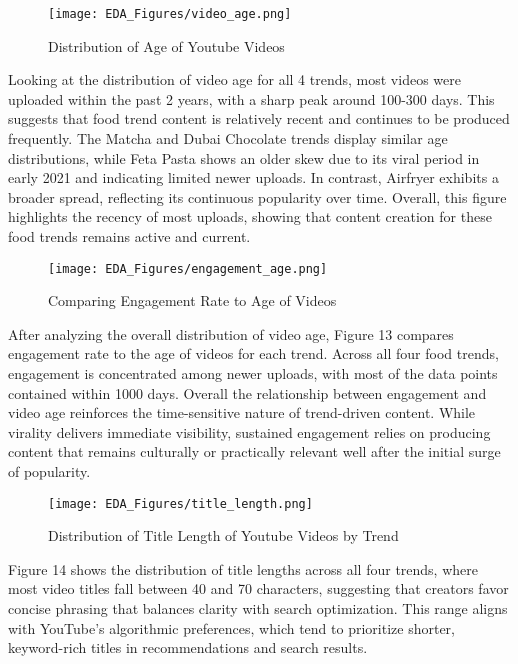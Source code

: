 \documentclass{article}
\begin{document}
\begin{figure}[H]
    \centering
    \texttt{[image: EDA\_Figures/video\_age.png]}
    \caption{Distribution of Age of Youtube Videos}
    \label{fig:video_age}
\end{figure}

Looking at the distribution of video age for all 4 trends, most videos were uploaded within the past 2 years, with a sharp peak around 100-300 days. This suggests that food trend content is relatively recent and continues to be produced frequently. The Matcha and Dubai Chocolate trends display similar age distributions, while Feta Pasta shows an older skew due to its viral period in early 2021 and indicating limited newer uploads. In contrast, Airfryer exhibits a broader spread, reflecting its continuous popularity over time. Overall, this figure highlights the recency of most uploads, showing that content creation for these food trends remains active and current.

\begin{figure}[H]
    \centering
    \texttt{[image: EDA\_Figures/engagement\_age.png]}
    \caption{Comparing Engagement Rate to Age of Videos}
    \label{fig:engagement_age}
\end{figure}

After analyzing the overall distribution of video age, Figure 13 compares engagement rate to the age of videos for each trend. Across all four food trends, engagement is concentrated among newer uploads, with most of the data points contained within 1000 days. Overall the relationship between engagement and video age reinforces the time-sensitive nature of trend-driven content. While virality delivers immediate visibility, sustained engagement relies on producing content that remains culturally or practically relevant well after the initial surge of popularity. 

\begin{figure}[H]
    \centering
    \texttt{[image: EDA\_Figures/title\_length.png]}
    \caption{Distribution of Title Length of Youtube Videos by Trend}
    \label{fig:title_length}
\end{figure}

Figure 14 shows the distribution of title lengths across all four trends, where most video titles fall between 40 and 70 characters, suggesting that creators favor concise phrasing that balances clarity with search optimization. This range aligns with YouTube’s algorithmic preferences, which tend to prioritize shorter, keyword-rich titles in recommendations and search results.
\end{document}
